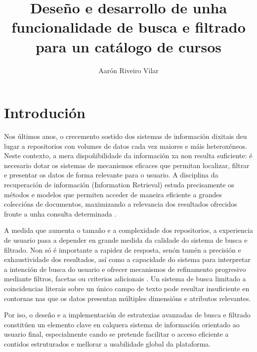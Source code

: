 \documentclass[%
    a4paper,               %
    twoside,                %
    parskip=full,           %
    10pt,                   %
    titlepage=on,           %
    captions=tableabove,    %
]{article}                  %
\title{Deseño e desarrollo de unha funcionalidade de busca e filtrado para un catálogo de cursos}
\author{Aarón Riveiro Vilar}
\begin{document}
\maketitle
\tableofcontents
\clearpage

\section{Introdución}
Nos últimos anos, o crecemento sostido dos sistemas de información dixitais deu lugar a repositorios con volumes de datos cada vez maiores e máis heteroxéneos. Neste contexto, a mera dispoñibilidade da información xa non resulta suficiente: é necesario dotar os sistemas de mecanismos eficaces que permitan localizar, filtrar e presentar os datos de forma relevante para o usuario. A disciplina da recuperación de información (Information Retrieval) estuda precisamente os métodos e modelos que permiten acceder de maneira eficiente a grandes coleccións de documentos, maximizando a relevancia dos resultados ofrecidos fronte a unha consulta determinada \cite{information_retrieval}.

A medida que aumenta o tamaño e a complexidade dos repositorios, a experiencia de usuario pasa a depender en grande medida da calidade do sistema de busca e filtrado. Non só é importante a rapidez de resposta, senón tamén a precisión e exhaustividade dos resultados, así como a capacidade do sistema para interpretar a intención de busca do usuario e ofrecer mecanismos de refinamento progresivo mediante filtros, facetas ou criterios adicionais \cite{retrieval_accuracy}. Un sistema de busca limitado a coincidencias literais sobre un único campo de texto pode resultar insuficiente en contornas nas que os datos presentan múltiples dimensións e atributos relevantes.

Por iso, o deseño e a implementación de estratexias avanzadas de busca e filtrado constitúen un elemento clave en calquera sistema de información orientado ao usuario final, especialmente cando se pretende facilitar o acceso eficiente a contidos estruturados e mellorar a usabilidade global da plataforma.

\end{document}
